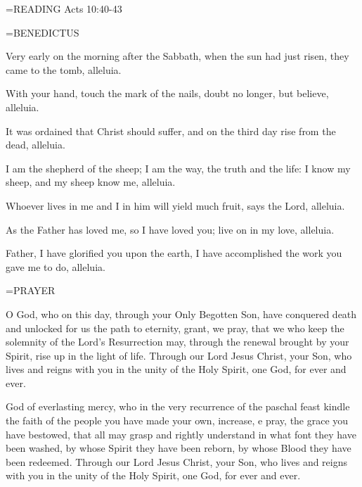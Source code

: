 \hangindent=\parindent \small{\uppercase{READING}}    Acts 10:40-43 \textbf{   \\}

\hangindent=\parindent \small BENEDICTUS
\begin{description}[labelindent=\parindent, leftmargin=*]
\item [Easter Sunday:] 	Very early on the morning after the Sabbath, when the sun had just risen, they came to the tomb, alleluia.
\item [Divine Mercy Sunday:] 	With your hand, touch the mark of the nails, doubt no longer, but believe, alleluia.
\item [3rd Sunday:] 		It was ordained that Christ should suffer, and on the third day rise from the dead, alleluia.
\item [4th Sunday:] 		I am the shepherd of the sheep; I am the way, the truth and the life: I know my sheep, and my sheep know me, alleluia.
\item [5th Sunday:] 		Whoever lives in me and I in him will yield much fruit, says the Lord, alleluia.
\item [6th Sunday:] 		As the Father has loved me, so I have loved you; live on in my love, alleluia.
\item [7th Sunday:] 		Father, I have glorified you upon the earth, I have accomplished the work you gave me to do, alleluia.
\end{description}

\hangindent=\parindent \small PRAYER
\begin{description}[labelindent=\parindent, leftmargin=*]
\item [Easter Sunday:] 	O God, who on this day, through your Only Begotten Son, have conquered death and unlocked for us the path to eternity, grant, we pray, that we who keep the solemnity of the Lord's Resurrection may, through the renewal brought by your Spirit, rise up in the light of life. Through our Lord Jesus Christ, your Son, who lives and reigns with you in the unity of the Holy Spirit, one God, for ever and ever.
\item [Divine Mercy Sunday:] 	God of everlasting mercy, who in the very recurrence of the paschal feast kindle the faith of the people you have made your own, increase, e pray, the grace you have bestowed, that all may grasp and rightly understand in what font they have been washed, by whose Spirit they have been reborn, by whose Blood they have been redeemed. Through our Lord Jesus Christ, your Son, who lives and reigns with you in the unity of the Holy Spirit, one God, for ever and ever.
\item [3rd Sunday:] 		
\item [4th Sunday:] 		
\item [5th Sunday:] 		
\item [6th Sunday:] 		
\item [7th Sunday:] 	
\end{description}

